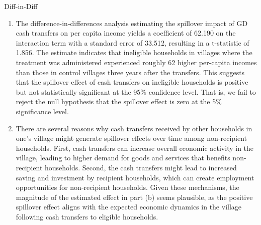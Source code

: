 \begin{homeworkProblem}{Diff-in-Diff}
\begin{solution}
\begin{enumerate}
\begin{enumerate}
                    For the regression of having an elderly member on cash
                    village status at baseline, the coefficient is -0.026 with
                    a standard error of 0.024, yielding a t-statistic of -1.100.
                    This suggests that there is again no statistically 
                    significant difference in the proportion of households with 
                    elderly members between cash and control villages at 
                    baseline.

                    Taken together, these findings suggest that ineligible
                    households are relatively similar in cash villages versus
                    control villages along these two dimensions, which supports
                    the validity of the difference-in-differences approach.

                \item The difference-in-differences analysis estimating the
                    spillover impact of GD cash transfers on per capita income
                    yields a coefficient of 62.190 on the interaction term with 
                    a standard error of 33.512, resulting in a t-statistic of 
                    1.856. The estimate indicates that ineligible households 
                    in villages where the treatment was administered 
                    experienced roughly 62 higher per-capita incomes than those 
                    in control villages three years after the transfers.
                    This suggests that the spillover effect of cash 
                    transfers on ineligible households is positive but not 
                    statistically significant at the 95\% confidence level.
                    That is, we fail to reject the null hypothesis that the 
                    spillover effect is zero at the 5\% significance level.

                \item There are several reasons why cash transfers received by
                    other households in one's village might generate spillover
                    effects over time among non-recipient households. First,
                    cash transfers can increase overall economic activity in 
                    the village, leading to higher demand for goods and 
                    services that benefits non-recipient households. Second, 
                    the cash transfers might lead to increased saving and
                    investment by recipient households, which can create
                    employment opportunities for non-recipient households.
                    Given these mechanisms, the magnitude of the estimated 
                    effect in part (b) seems plausible, as the positive 
                    spillover effect aligns with the expected economic dynamics 
                    in the village following cash transfers to eligible 
                    households.
            \end{enumerate}
        \end{enumerate}
    \end{solution}

\end{homeworkProblem}